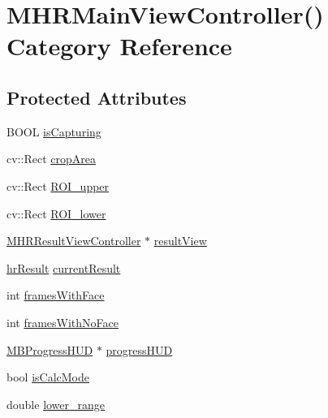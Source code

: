 \hypertarget{category_m_h_r_main_view_controller_07_08}{\section{M\+H\+R\+Main\+View\+Controller() Category Reference}
\label{category_m_h_r_main_view_controller_07_08}
}
\subsection*{Protected Attributes}
\begin{DoxyCompactItemize}
\item 
B\+O\+O\+L \hyperlink{category_m_h_r_main_view_controller_07_08_a0b32e144ea6d386ce5180a75b7f1ac76}{is\+Capturing}
\item 
cv\+::\+Rect \hyperlink{category_m_h_r_main_view_controller_07_08_a2508c2c272b97794449944d901733307}{crop\+Area}
\item 
cv\+::\+Rect \hyperlink{category_m_h_r_main_view_controller_07_08_a8ec78910220259631707236b9160c626}{R\+O\+I\+\_\+upper}
\item 
cv\+::\+Rect \hyperlink{category_m_h_r_main_view_controller_07_08_a8e5e7cd7481bac3b8bf77d684976a283}{R\+O\+I\+\_\+lower}
\item 
\hyperlink{interface_m_h_r_result_view_controller}{M\+H\+R\+Result\+View\+Controller} $\ast$ \hyperlink{category_m_h_r_main_view_controller_07_08_aee235ca60383f404b812a075eca55e75}{result\+View}
\item 
\hyperlink{struct_m_h_r_1_1hr_result}{hr\+Result} \hyperlink{category_m_h_r_main_view_controller_07_08_a8c4078159735c117ecbeb565b9c287e2}{current\+Result}
\item 
int \hyperlink{category_m_h_r_main_view_controller_07_08_a796178035a8c8f1b629b666076fe1ef3}{frames\+With\+Face}
\item 
int \hyperlink{category_m_h_r_main_view_controller_07_08_a7c19b115c59979a430b286b0ab7d57cc}{frames\+With\+No\+Face}
\item 
\hyperlink{interface_m_b_progress_h_u_d}{M\+B\+Progress\+H\+U\+D} $\ast$ \hyperlink{category_m_h_r_main_view_controller_07_08_ad7e9d3339af1110426f965b7615b5988}{progress\+H\+U\+D}
\item 
bool \hyperlink{category_m_h_r_main_view_controller_07_08_ade66611f85011833b732d24a430338e8}{is\+Calc\+Mode}
\item 
double \hyperlink{category_m_h_r_main_view_controller_07_08_ac4984c4b9f2c0ed7a71d957858a0b690}{lower\+\_\+range}

\end{DoxyCompactItemize}
